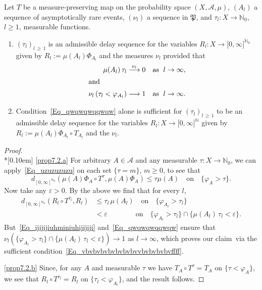 \documentclass[AHL,Unicode,longabstracts]{cedram}
\newcommand{\clA}{\mathcal{A}}
\newcommand{\frkP}{\mathfrak{P}}
\newcommand{\bbN}{\mathbb{N}}
\newcommand*{\alphenumi}{\renewcommand*{\theenumi}{\alph{enumi}}}
\begin{document}
\begin{prop}\label{P_CharAdmissTimeDelay}
Let $T$ be a measure-preserving map on the probability space $(X,\clA,\mu)$, $(A_{l})$ a sequence of asymptotically rare events, $(\nu_{l})$ a sequence in $\frkP$, and $\tau_{l}:X\rightarrow\bbN_{0}$, $l\geq1$, measurable functions.
\begin{enumerate}\alphenumi
\item \label{prop7.2.a}$(\tau_{l})_{l\,\geq\,1}$ is an admissible delay sequence for the variables $R_{l}:X\rightarrow\lbrack0,\infty]^{\bbN_{0}}$ given by $R_{l}:=\mu(A_{l})\Phi_{A_{l}}$ and the measures $\nu_{l}$ provided that
\begin{align}\mu(A_{l})\,\tau_{l}\overset{\nu_{l}}{\longrightarrow}0\quad &\text{as }\;l\rightarrow\infty,
\label{Eq_ijijijiuhminiuhijijiji} 
\\
\intertext{and}
\nu_{l}\left(\tau_{l}<\varphi_{A_{l}}\right) \longrightarrow1\quad &\text{as }\;l\rightarrow\infty. 
\label{Eq_qwqwqwqqwqw}
\end{align}
\item\label{prop7.2.b} Condition~\eqref{Eq_qwqwqwqqwqw} alone is sufficient for $(\tau_{l})_{l\,\geq\,1}$ to be an admissible delay sequence for the variables $R_{l}:X\rightarrow\lbrack0,\infty]^{\bbN}$ given by $R_{l}:=\mu (A_{l})\Phi_{A_{l}}\circ T_{A_{l}}$ and the $\nu_{l}$.
\end{enumerate}
\end{prop}

\begin{proof}\ \\*[0.10em]
\eqref{prop7.2.a} For arbitrary $A\in\clA$ and any measurable $\tau :X\rightarrow\bbN_{0}$, we can apply~\eqref{Eq_uzuzuzuzu} on each set $\{\tau=m\}$, $m\geq0$, to see that
\begin{equation}
d_{[0,\infty]^{\bbN_{0}}}(\mu(A)\Phi_{A}\circ T^{\tau},\mu(A)\Phi _{A})\leq\tau\mu(A) \quad\text{on}\quad\{\varphi_{A}>\tau\}.
\end{equation}
Now take any $\varepsilon>0$. By the above we find that for every $l$,
\begin{align}
d_{[0,\infty]^{\bbN_{0}}}(R_{l}\circ T^{\tau_{l}},R_{l}) & \leq
\tau_{l}\,\mu(A_{l})\quad\text{on}\quad\{\varphi_{A_{l}}>\tau_{l}\}\nonumber\\
& <\varepsilon\qquad\qquad \!\text{on}\quad
\{\varphi_{A_{l}}>\tau_{l}\}\cap
\{\mu(A_{l})\,\tau_{l}<\varepsilon\}.
\end{align}
But~\eqref{Eq_ijijijiuhminiuhijijiji} and~\eqref{Eq_qwqwqwqqwqw} ensure that $\nu_{l}(\{\varphi_{A_{l}}>\tau_{l}\}\cap\{\mu(A_{l})\,\tau_{l}<\varepsilon
\})\rightarrow1$ as $l\rightarrow\infty$, which proves our claim~via the sufficient condition~\eqref{Eq_vbvbvbvbvbvbvbvvbvbvbvbvffff}.

\vspace{4pt}
\noindent\eqref{prop7.2.b} Since, for any $A$ and measurable $\tau$ we have $T_{A}\circ T^{\tau}=T_{A}$ on $\{\tau<\varphi_{A}\}$, we see that $R_{l}\circ T^{\tau _{l}}=R_{l}$ on $\{\tau_{l}<\varphi_{A_{l}}\}$, and the result follows.
\end{proof}
\end{document}
